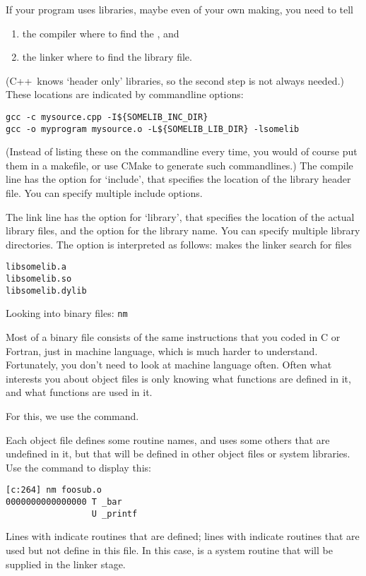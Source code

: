
If your program uses libraries, maybe even of your own making,
you need to tell
\begin{enumerate}
\item the compiler where to find the , and
\item the linker where to find the library file.
\end{enumerate}
(C++~knows `header only' libraries, so the second step is not always needed.)
These locations are indicated by commandline options:
\begin{lstlisting}
gcc -c mysource.cpp -I${SOMELIB_INC_DIR}
gcc -o myprogram mysource.o -L${SOMELIB_LIB_DIR} -lsomelib
\end{lstlisting}
(Instead of listing these on the commandline every time,
you would of course put them in a makefile, or use CMake to
generate such commandlines.)
The compile line has the  option for `include', that specifies
the location of the library header file.
You can specify multiple include options.

The link line has the  option for `library',
that specifies the location of the actual library files,
and the  option for the library name.
You can specify multiple library directories.
The  option is interpreted as follows:
 makes the linker search for files
\begin{lstlisting}
libsomelib.a
libsomelib.so
libsomelib.dylib
\end{lstlisting}


 {Looking into binary files: \texttt{nm}}


Most of a binary file consists of the same instructions that you
coded in C or Fortran, just in machine language, which
is much harder to understand.
Fortunately, you don't need to look at machine language often.
Often what interests you about object files is only knowing
what functions are defined in it, and what functions are used in it.

For this, we use the  command.

Each object file defines some routine names, and uses some others that
are undefined in it, but that will be defined in other object files or
system libraries. Use the  command to display
this:
\begin{verbatim}
[c:264] nm foosub.o
0000000000000000 T _bar
                 U _printf
\end{verbatim}
Lines with  indicate routines that are defined; lines with 
indicate routines that are used but not define in this file. In this
case,  is a system routine that will be supplied in the
linker stage.

